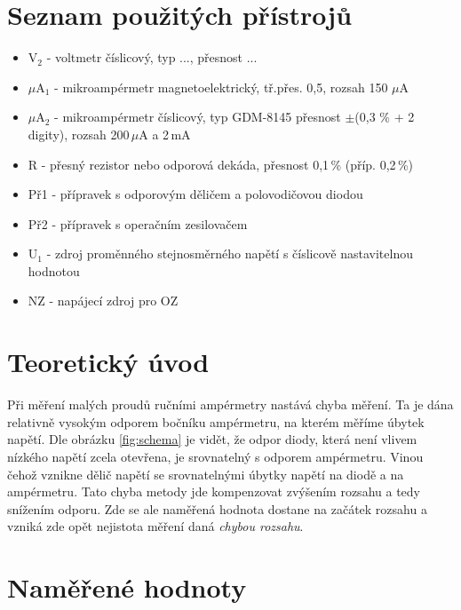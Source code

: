 \documentclass[a4paper,12pt]{article}   %
\newcommand{\tsub}[1]{$_\textrm{#1}$}
\newcommand{\tmu}{$\mu$}
\newcommand{\tpm}{$\pm$}
\begin{document}
\section{Seznam použitých přístrojů}

\begin{itemize}
    \item V\tsub{2} - voltmetr číslicový, typ ..., přesnost ...
    \item $\mu$A\tsub{1} - mikroampérmetr magnetoelektrický, tř.přes. 0,5, rozsah 150 \tmu A
    \item $\mu$A\tsub{2} - mikroampérmetr číslicový, typ GDM-8145 přesnost \tpm (0,3 \% + 2 digity), rozsah 200\,\tmu A a 2\,mA
    \item R - přesný rezistor nebo odporová dekáda, přesnost 0,1\,\% (příp. 0,2\,\%)
    \item Př1 - přípravek s odporovým děličem a polovodičovou diodou
    \item Př2 - přípravek s operačním zesilovačem
    \item U\tsub{1} - zdroj proměnného stejnosměrného napětí s číslicově nastavitelnou hodnotou 
    \item NZ - napájecí zdroj pro OZ
\end{itemize}



\section{Teoretický úvod}

Při měření malých proudů ručními ampérmetry nastává chyba měření. Ta je dána relativně vysokým odporem bočníku ampérmetru, na kterém měříme úbytek napětí. Dle obrázku \ref{fig:schema} je vidět, že odpor diody, která není vlivem nízkého napětí zcela otevřena, je srovnatelný s odporem ampérmetru. Vinou čehož vznikne dělič napětí se srovnatelnými úbytky napětí na diodě a na ampérmetru. Tato chyba metody jde kompenzovat zvýšením rozsahu a tedy snížením odporu. Zde se ale naměřená hodnota dostane na začátek rozsahu a vzniká zde opět nejistota měření daná \textit{chybou rozsahu}. 



\section{Naměřené hodnoty}
\end{document}

